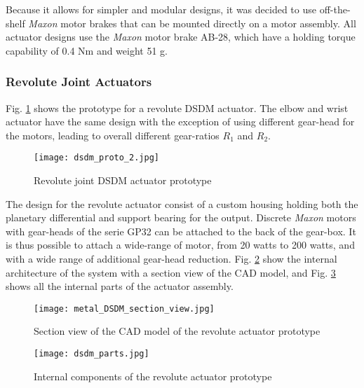 Because it allows for simpler and modular designs, it was decided to use off-the-shelf \textit{Maxon} motor brakes that can be mounted directly on a motor assembly. All actuator designs use the \textit{Maxon} motor brake AB-28, which have a holding torque capability of 0.4 Nm and weight 51 g. 


\subsubsection{Revolute Joint Actuators}

Fig. \ref{fig:dsdm_act} shows the prototype for a revolute DSDM actuator. The elbow and wrist actuator have the same design with the exception of using different gear-head for the motors, leading to overall different gear-ratios $R_1$ and $R_2$.
%
\begin{figure}[htp]
	\centering
		\texttt{[image: dsdm\_proto\_2.jpg]}
	\caption{Revolute joint DSDM actuator prototype } %
	\label{fig:dsdm_act}
\end{figure}
%
The design for the revolute actuator consist of a custom housing holding both the planetary differential and support bearing for the output. Discrete \textit{Maxon} motors with gear-heads of the serie GP32 can be attached to the back of the gear-box. It is thus possible to attach a wide-range of motor, from 20 watts to 200 watts, and with a wide range of additional gear-head reduction. Fig. \ref{fig:dsdm_section} show the internal architecture of the system with a section view of the CAD model, and Fig. \ref{fig:dsdm_parts} shows all the internal parts of the actuator assembly. 

\begin{figure}[htp]
	\centering
		\texttt{[image: metal\_DSDM\_section\_view.jpg]}
	\caption{Section view of the CAD model of the revolute actuator prototype} %
	\label{fig:dsdm_section}
\end{figure}

\begin{figure}[htbp]
	\centering
		\texttt{[image: dsdm\_parts.jpg]}
	\caption{Internal components of the revolute actuator prototype}
	\label{fig:dsdm_parts}
\end{figure}

